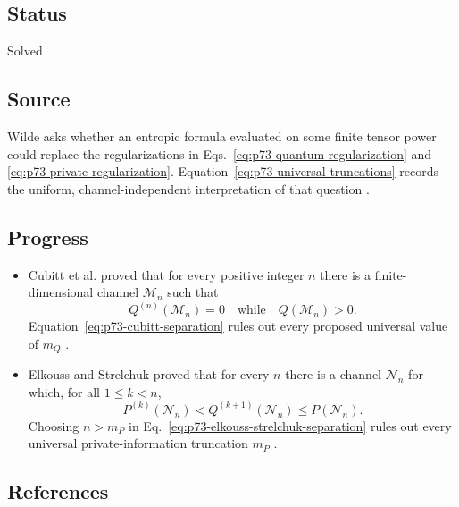 \subsection*{Status}

Solved

\subsection*{Source}

Wilde asks whether an entropic formula evaluated on some finite tensor power
could replace the regularizations in Eqs.~\eqref{eq:p73-quantum-regularization}
and \eqref{eq:p73-private-regularization}.  Equation~\eqref{eq:p73-universal-truncations}
records the uniform, channel-independent interpretation of that question
.

\subsection*{Progress}

\begin{itemize}
  \item Cubitt et al. proved that for every positive integer $n$ there is a
  finite-dimensional channel $\mathcal M_n$ such that
  \begin{equation}
    Q^{(n)}(\mathcal M_n)=0
    \quad\text{while}\quad
    Q(\mathcal M_n)>0.
    \label{eq:p73-cubitt-separation}
  \end{equation}
  Equation~\eqref{eq:p73-cubitt-separation} rules out every proposed
  universal value of $m_Q$
  .

  \item Elkouss and Strelchuk proved that for every $n$ there is a channel
  $\mathcal N_n$ for which, for all $1\leq k<n$,
  \begin{equation}
    P^{(k)}(\mathcal N_n)
    <Q^{(k+1)}(\mathcal N_n)
    \leq P(\mathcal N_n).
    \label{eq:p73-elkouss-strelchuk-separation}
  \end{equation}
  Choosing $n>m_P$ in
  Eq.~\eqref{eq:p73-elkouss-strelchuk-separation} rules out every universal
  private-information truncation $m_P$
  .
\end{itemize}

\subsection*{References}

